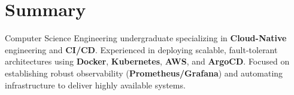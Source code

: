 \section*{Summary}
\BigDivider
\noindent
Computer Science Engineering undergraduate specializing in \textbf{Cloud-Native} engineering and \textbf{CI/CD}. Experienced in deploying scalable, fault-tolerant architectures using \textbf{Docker}, \textbf{Kubernetes}, \textbf{AWS}, and \textbf{ArgoCD}. Focused on establishing robust observability (\textbf{Prometheus/Grafana}) and automating infrastructure to deliver highly available systems.